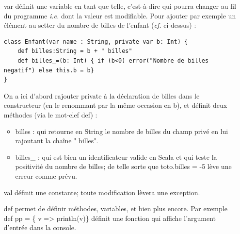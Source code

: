 \documentclass[a4paper,11pt,french]{report}
\begin{document}
\begin{description}
\begin{itemize}
\item[\textsf{var}] définit une variable en tant que telle, c'est-à-dire qui pourra changer au fil du programme \textit{i.e.} dont la valeur est modifiable. Pour ajouter par exemple un élément au setter du nombre de billes de l'enfant (\emph{cf.} ci-dessus) :
\begin{lstlisting}[frame=trBL]
class Enfant(var name : String, private var b: Int) {
	def billes:String = b + " billes"
	def billes_=(b: Int) { if (b<0) error("Nombre de billes negatif") else this.b = b}
}
\end{lstlisting}
On a ici d'abord rajouter \textsf{private} à la déclaration de \textsf{billes} dans le constructeur (en le renommant par la même occasion en \textsf{b}), et définit deux méthodes (via le mot-clef \textsf{def}) :

\begin{itemize}
\item billes : qui retourne en \textsf{String} le nombre de billes du champ privé en lui rajoutant la cha\^ine \textsf{" billes"}.
\item billes\_ : qui est bien un identificateur valide en Scala et qui teste la positivité du nombre de billes; de telle sorte que \textsf{toto.billes = -5} lève une erreur comme prévu.\\
\end{itemize}

\item[\textsf{val}] définit une constante; toute modification lèvera une exception.\\

\item[\textsf{def}] permet de définir méthodes, variables, et bien plus encore. Par exemple \textsf{def pp = \{ v => println(v)\} } définit une fonction qui affiche l'argument d'entrée dans la console.
\end{itemize}
\end{description}
\end{document}
